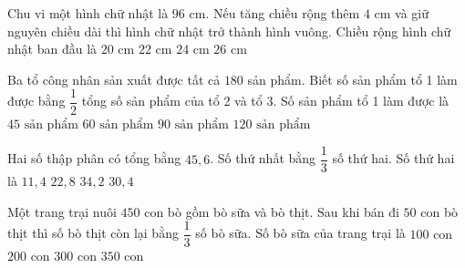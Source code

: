 \begin{ex} %
Chu vi một hình chữ nhật là $96\text{ cm}$. Nếu tăng chiều rộng thêm $4\text{ cm}$ và giữ nguyên chiều dài thì hình chữ nhật trở thành hình vuông. Chiều rộng hình chữ nhật ban đầu là
\choice
{$20\text{ cm}$}
{\True $22\text{ cm}$}
{$24\text{ cm}$}
{$26\text{ cm}$}
\end{ex}

\begin{ex} %
Ba tổ công nhân sản xuất được tất cả $180$ sản phẩm. Biết số sản phẩm tổ 1 làm được bằng $\dfrac{1}{2}$ tổng số sản phẩm của tổ 2 và tổ 3. Số sản phẩm tổ 1 làm được là
\choice
{$45\text{ sản phẩm}$}
{\True $60\text{ sản phẩm}$}
{$90\text{ sản phẩm}$}
{$120\text{ sản phẩm}$}
\end{ex}

\begin{ex} %
Hai số thập phân có tổng bằng $45{,}6$. Số thứ nhất bằng $\dfrac{1}{3}$ số thứ hai. Số thứ hai là
\choice
{$11{,}4$}
{$22{,}8$}
{\True $34{,}2$}
{$30{,}4$}
\end{ex}

\begin{ex} %
Một trang trại nuôi $450$ con bò gồm bò sữa và bò thịt. Sau khi bán đi $50$ con bò thịt thì số bò thịt còn lại bằng $\dfrac{1}{3}$ số bò sữa. Số bò sữa của trang trại là
\choice
{$100\text{ con}$}
{$200\text{ con}$}
{\True $300\text{ con}$}
{$350\text{ con}$}
\end{ex}

